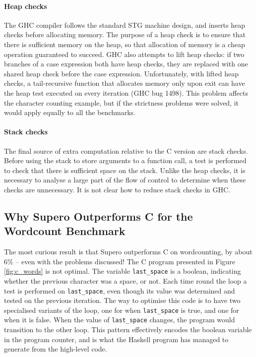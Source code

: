 \paragraph{Heap checks}

The GHC compiler follows the standard STG machine \cite{spj:stg} design, and inserts heap checks before allocating memory. The purpose of a heap check is to ensure that there is sufficient memory on the heap, so that allocation of memory is a cheap operation guaranteed to succeed. GHC also attempts to lift heap checks: if two branches of a case expression both have heap checks, they are replaced with one shared heap check before the case expression. Unfortunately, with lifted heap checks, a tail-recursive function that allocates memory only upon exit can have the heap test executed on every iteration (GHC bug 1498). This problem affects the character counting example, but if the strictness problems were solved, it would apply equally to all the benchmarks.

\paragraph{Stack checks}

The final source of extra computation relative to the C version are stack checks. Before using the stack to store arguments to a function call, a test is performed to check that there is sufficient space on the stack. Unlike the heap checks, it is necessary to analyse a large part of the flow of control to determine when these checks are unnecessary. It is not clear how to reduce stack checks in GHC.

\subsection{Why Supero Outperforms C for the Wordcount Benchmark}

The most curious result is that Supero outperforms C on wordcounting, by about 6\% -- even with the problems discussed! The C program presented in Figure \ref{fig:c_words} is not optimal. The variable \verb"last_space" is a boolean, indicating whether the previous character was a space, or not. Each time round the loop a test is performed on \verb"last_space", even though its value was determined and tested on the previous iteration. The way to optimise this code is to have two specialised variants of the loop, one for when \verb"last_space" is true, and one for when it is false. When the value of \verb"last_space" changes, the program would transition to the other loop. This pattern effectively encodes the boolean variable in the program counter, and is what the Haskell program has managed to generate from the high-level code.

